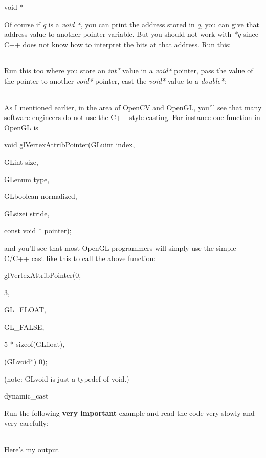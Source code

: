 \documentclass[
]{article}
\begin{document}
void *

Of course if \emph{q} is a \emph{void *}, you can print the address
stored in \emph{q}, you can give that address value to another pointer
variable. But you should not work with \emph{*q} since C++ does not know
how to interpret the bits at that address. Run this:

\begin{longtable}[]{@{}@{}}
\toprule
\endhead
\bottomrule
\end{longtable}

Run this too where you store an \emph{int*} value in a \emph{void*}
pointer, pass the value of the pointer to another \emph{void*} pointer,
cast the \emph{void*} value to a \emph{double*}:

\begin{longtable}[]{@{}@{}}
\toprule
\endhead
\bottomrule
\end{longtable}

As I mentioned earlier, in the area of OpenCV and OpenGL, you'll see
that many software engineers do not use the C++ style casting. For
instance one function in OpenGL is

void glVertexAttribPointer(GLuint index,

GLint size,

GLenum type,

GLboolean normalized,

GLsizei stride,

const void * pointer);

and you'll see that most OpenGL programmers will simply use the simple
C/C++ cast like this to call the above function:

glVertexAttribPointer(0,

3,

GL\_FLOAT,

GL\_FALSE,

5 * sizeof(GLfloat),

(GLvoid*) 0);

(note: GLvoid is just a typedef of void.)

dynamic\_cast

Run the following \textbf{very important} example and read the code very
slowly and very carefully:

\begin{longtable}[]{@{}@{}}
\toprule
\endhead
\bottomrule
\end{longtable}

Here's my output

\begin{longtable}[]{@{}@{}}
\toprule
\endhead
\bottomrule
\end{longtable}
\end{document}
